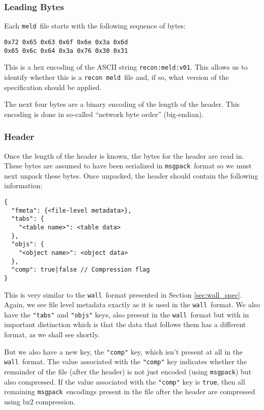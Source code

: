 \documentclass[11pt,a4paper,twocolumn]{article}
\newcommand{\recon}{\texttt{recon}}
\newcommand{\wall}{\texttt{wall}}
\newcommand{\meld}{\texttt{meld}}
\newcommand{\msgpack}{\texttt{msgpack}}
\newcommand{\code}[1]{\texttt{#1}} %
\begin{document}
\subsubsection{Leading Bytes}

Each \meld\ file starts with the following sequence of bytes:

\begin{verbatim}
0x72 0x65 0x63 0x6f 0x6e 0x3a 0x6d
0x65 0x6c 0x64 0x3a 0x76 0x30 0x31
\end{verbatim}

This is a hex encoding of the ASCII string \code{recon:meld:v01}.
This allows us to identify whether this is a \recon\ \meld\ file and, if
so, what version of the specification should be applied.

The next four bytes are a binary encoding of the length of the header.
This encoding is done in so-called ``network byte order''
(big-endian).

\subsubsection{Header}
\label{sec:meld_head}

Once the length of the header is known, the bytes for the header are
read in.  These bytes are assumed to have been serialized in
\msgpack\ format so we must next unpack these bytes.  Once unpacked,
the header should contain the following information:

\begin{verbatim}
{
  "fmeta": {<file-level metadata>},
  "tabs": {
    "<table name>": <table data>
  },
  "objs": {
    "<object name>": <object data>
  },
  "comp": true|false // Compression flag
}
\end{verbatim}

This is very similar to the \wall\ format presented in Section
\ref{sec:wall_spec}.  Again, we see file level metadata exactly as it
is used in the \wall\ format.  We also have the \code{"tabs"} and
\code{"objs"} keys, also present in the \wall\ format but with in
important distinction which is that the data that follows them has a
different format, as we shall see shortly.

But we also have a new key, the \code{"comp"} key, which isn't present
at all in the \wall\ format.  The value associated with the
\code{"comp"} key indicates whether the remainder of the file (after
the header) is not just encoded (using \msgpack) but also compressed.  If
the value associated with the \code{"comp"} key is \code{true}, then
all remaining \msgpack\ encodings present in the file after the header
are compressed using bz2\cite{BZ2} compression.
\end{document}
